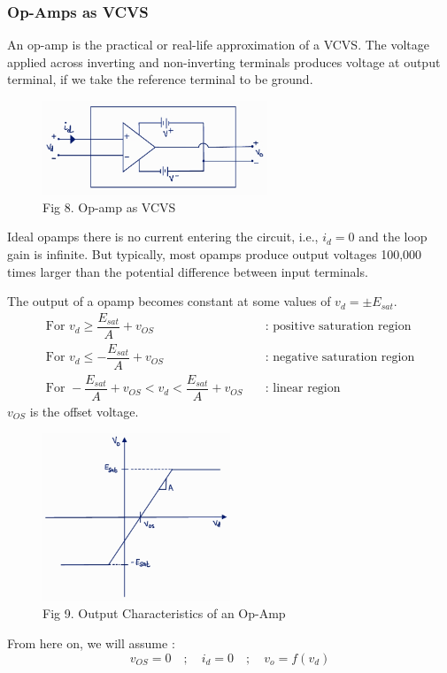 \documentclass[12pt]{article}
\begin{document}
\subsubsection{Op-Amps as VCVS}
An op-amp is the practical or real-life approximation of a VCVS. The voltage applied across inverting and non-inverting terminals produces voltage at output terminal, if we take the reference terminal to be ground.
\begin{figure}[H]
	\centering
	\includegraphics[width=0.6\textwidth]{Images/fig8_opamp as vcvs.png}
	\caption{Fig 8. Op-amp as VCVS}
\end{figure}
Ideal opamps there is no current entering the circuit, i.e., $i_d=0$ and the loop gain is infinite. But typically, most opamps produce output voltages 100,000 times larger than the potential difference between input terminals. \linebreak

The output of a opamp becomes constant at some values of $v_d=\pm E_{sat}$.
\begin{align*}
	\text{For } v_d\geq \dfrac{E_{sat}}{A}+v_{OS} & \quad \text{: positive saturation region} \\
	\text{For } v_d\leq-\dfrac{E_{sat}}{A}+v_{OS} & \quad \text{: negative saturation region} \\
	\text{For } -\dfrac{E_{sat}}{A}+v_{OS}< v_d < \dfrac{E_{sat}}{A}+v_{OS} & \quad \text{: linear region}
\end{align*}
$v_{OS}$ is the offset voltage. 
\begin{figure}[H]
	\centering
	\includegraphics[width=0.5\textwidth]{Images/fig9_opamp characteristics.png}
	\caption{Fig 9. Output Characteristics of an Op-Amp}
\end{figure}
From here on, we will assume :
\[ v_{OS} =0 \quad ; \quad i_d=0 \quad ; \quad v_o=f(v_d) \]
%
\end{document}
